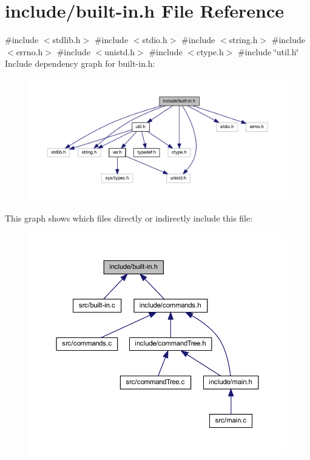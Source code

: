 \hypertarget{built-in_8h}{}\section{include/built-\/in.h File Reference}
\label{built-in_8h}
{\ttfamily \#include $<$stdlib.\+h$>$}\newline
{\ttfamily \#include $<$stdio.\+h$>$}\newline
{\ttfamily \#include $<$string.\+h$>$}\newline
{\ttfamily \#include $<$errno.\+h$>$}\newline
{\ttfamily \#include $<$unistd.\+h$>$}\newline
{\ttfamily \#include $<$ctype.\+h$>$}\newline
{\ttfamily \#include \char`\"{}util.\+h\char`\"{}}\newline
Include dependency graph for built-\/in.h\+:\nopagebreak
\begin{figure}[H]
\begin{center}
\leavevmode
\includegraphics[width=350pt]{built-in_8h__incl}
\end{center}
\end{figure}
This graph shows which files directly or indirectly include this file\+:\nopagebreak
\begin{figure}[H]
\begin{center}
\leavevmode
\includegraphics[width=350pt]{built-in_8h__dep__incl}
\end{center}
\end{figure}
